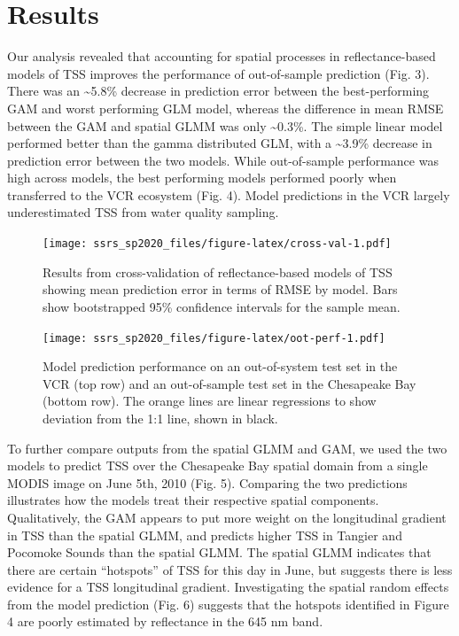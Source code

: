 \documentclass[11pt,]{article}
\begin{document}
\hypertarget{results}{%
\section{Results}\label{results}}

Our analysis revealed that accounting for spatial processes in
reflectance-based models of TSS improves the performance of
out-of-sample prediction (Fig. 3). There was an \textasciitilde5.8\%
decrease in prediction error between the best-performing GAM and worst
performing GLM model, whereas the difference in mean RMSE between the
GAM and spatial GLMM was only \textasciitilde0.3\%. The simple linear
model performed better than the gamma distributed GLM, with a
\textasciitilde3.9\% decrease in prediction error between the two
models. While out-of-sample performance was high across models, the best
performing models performed poorly when transferred to the VCR ecosystem
(Fig. 4). Model predictions in the VCR largely underestimated TSS from
water quality sampling.

\begin{figure}
\centering
\texttt{[image: ssrs\_sp2020\_files/figure-latex/cross-val-1.pdf]}
\caption{Results from cross-validation of reflectance-based models of
TSS showing mean prediction error in terms of RMSE by model. Bars show
bootstrapped 95\% confidence intervals for the sample mean.}
\end{figure}

\begin{figure}
\centering
\texttt{[image: ssrs\_sp2020\_files/figure-latex/oot-perf-1.pdf]}
\caption{Model prediction performance on an out-of-system test set in
the VCR (top row) and an out-of-sample test set in the Chesapeake Bay
(bottom row). The orange lines are linear regressions to show deviation
from the 1:1 line, shown in black.}
\end{figure}

To further compare outputs from the spatial GLMM and GAM, we used the
two models to predict TSS over the Chesapeake Bay spatial domain from a
single MODIS image on June 5th, 2010 (Fig. 5). Comparing the two
predictions illustrates how the models treat their respective spatial
components. Qualitatively, the GAM appears to put more weight on the
longitudinal gradient in TSS than the spatial GLMM, and predicts higher
TSS in Tangier and Pocomoke Sounds than the spatial GLMM. The spatial
GLMM indicates that there are certain ``hotspots'' of TSS for this day
in June, but suggests there is less evidence for a TSS longitudinal
gradient. Investigating the spatial random effects from the model
prediction (Fig. 6) suggests that the hotspots identified in Figure 4
are poorly estimated by reflectance in the 645 nm band.
\end{document}
